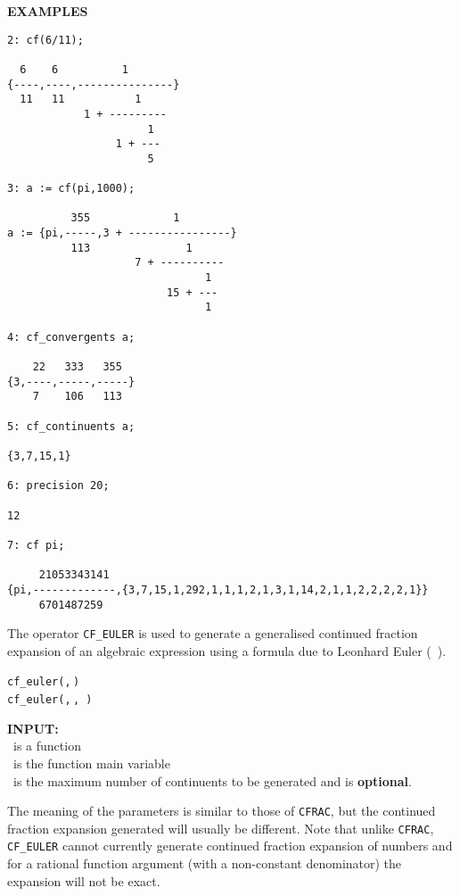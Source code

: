 \large{\textbf{EXAMPLES}}
\begin{verbatim}
2: cf(6/11);

  6    6          1
{----,----,---------------}
  11   11           1
            1 + ---------
                      1
                 1 + ---
                      5

3: a := cf(pi,1000);

          355             1
a := {pi,-----,3 + ----------------}
          113               1
                    7 + ----------
                               1
                         15 + ---
                               1

4: cf_convergents a;

    22   333   355
{3,----,-----,-----}
    7    106   113

5: cf_continuents a;

{3,7,15,1}

6: precision 20;

12

7: cf pi;

     21053343141
{pi,-------------,{3,7,15,1,292,1,1,1,2,1,3,1,14,2,1,1,2,2,2,2,1}}
     6701487259
\end{verbatim}

\hypertarget{CF_EULER:operator}{}
The operator \texttt{CF\_EULER} is used to generate a generalised
continued fraction expansion of an algebraic expression using a formula due to
Leonhard Euler (~\cite{Euler:1748}).
\begin{syntaxtable}
  \texttt{cf\_euler(}\texttt{,}\,\texttt{)}\\
  \texttt{cf\_euler(}\texttt{,}\,\texttt{,}\,%
    \texttt{)}
\end{syntaxtable}


\textbf{INPUT:}\\
\ is a function\\
 \ is the function main variable\\
 \ is the maximum number of continuents to be generated
and is \textbf{optional}.

The meaning of the parameters is similar to those of \texttt{CFRAC}, but the
continued fraction expansion generated will usually be different. Note that
unlike \texttt{CFRAC}, \texttt{CF\_EULER} cannot currently generate
continued fraction expansion of numbers and for a rational function argument
(with a non-constant denominator) the expansion will not be exact.

